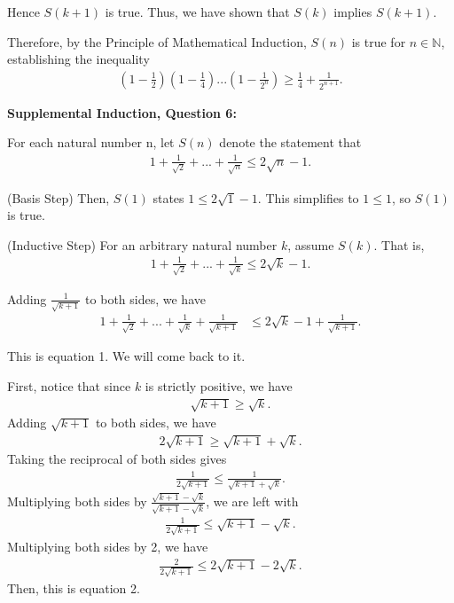 \documentclass[12pt]{article}
\begin{document}
Hence $S(k+1)$ is true. Thus, we have shown that $S(k)$ implies $S(k+1)$.

Therefore, by the Principle of Mathematical Induction, $S(n)$ is true for $n\in{\mathbb{N}}$, establishing the inequality
\begin{align*}
    \left(1-\frac{1}{2}\right)\left(1-\frac{1}{4}\right)...\left(1-\frac{1}{2^n}\right) \geq{} \frac{1}{4} + \frac{1}{2^{n+1}}.
\end{align*}

\noindent \textbf{Supplemental Induction, Question 6:}

For each natural number n, let $S(n)$ denote the statement that
\begin{align*}
    1 + \frac{1}{\sqrt{2}} + ... + \frac{1}{\sqrt{n}} \leq 2\sqrt{n} - 1.
\end{align*}

(Basis Step) Then, $S(1)$ states $1 \leq 2\sqrt{1}-1$.
This simplifies to $1 \leq 1$, so $S(1)$ is true.

(Inductive Step) For an arbitrary natural number $k$, assume $S(k)$. That is,
\begin{align*}
    1 + \frac{1}{\sqrt{2}} + ... + \frac{1}{\sqrt{k}} \leq 2\sqrt{k} - 1.
\end{align*}

Adding $\frac{1}{\sqrt{k+1}}$ to both sides, we have
\begin{align*}
    1 + \frac{1}{\sqrt{2}} + ... + \frac{1}{\sqrt{k}} + \frac{1}{\sqrt{k+1}} & \leq 2\sqrt{k} - 1 + \frac{1}{\sqrt{k+1}}. \tag{1}
\end{align*}

This is equation 1. We will come back to it.

First, notice that since $k$ is strictly positive, we have
\begin{align*}
    \sqrt{k+1} \geq \sqrt{k}.
\end{align*}
Adding $\sqrt{k+1}$ to both sides, we have
\begin{align*}
    2\sqrt{k+1} \geq \sqrt{k+1} + \sqrt{k}.
\end{align*}
Taking the reciprocal of both sides gives
\begin{align*}
    \frac{1}{2\sqrt{k+1}} \leq \frac{1}{\sqrt{k+1} + \sqrt{k}}.
\end{align*}
Multiplying both sides by $\frac{\sqrt{k+1}-\sqrt{k}}{\sqrt{k+1}-\sqrt{k}}$, we are left with
\begin{align*}
    \frac{1}{2\sqrt{k+1}} \leq \sqrt{k+1} - \sqrt{k}.
\end{align*}
Multiplying both sides by 2, we have
\begin{align*}
    \frac{2}{2\sqrt{k+1}} \leq 2\sqrt{k+1} - 2\sqrt{k}. \tag{2}
\end{align*}
Then, this is equation 2.
\end{document}
